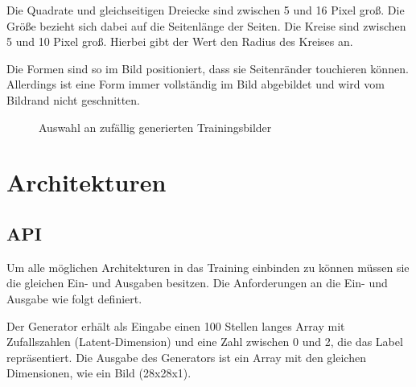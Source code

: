 Die Quadrate und gleichseitigen Dreiecke sind zwischen 5 und 16 Pixel groß.
Die Größe bezieht sich dabei auf die Seitenlänge der Seiten.
Die Kreise sind zwischen 5 und 10 Pixel groß.
Hierbei gibt der Wert den Radius des Kreises an.
\newline

Die Formen sind so im Bild positioniert, dass sie Seitenränder touchieren können.
Allerdings ist eine Form immer vollständig im Bild abgebildet und wird vom Bildrand nicht geschnitten.

\newcommand{\trainDataImage}[1]{\subfloat{\fbox{\texttt{[image: \#1]}}}}
\begin{figure}[H]
	\centering
	\trainDataImage{kapitel/3\_methodik/data/circle\_00.png}
	\trainDataImage{kapitel/3\_methodik/data/circle\_01.png}
	\trainDataImage{kapitel/3\_methodik/data/circle\_02.png}\par 
	
	\trainDataImage{kapitel/3\_methodik/data/rectangle\_00.png}
	\trainDataImage{kapitel/3\_methodik/data/rectangle\_01.png}
	\trainDataImage{kapitel/3\_methodik/data/rectangle\_02.png}\par 
	
	\trainDataImage{kapitel/3\_methodik/data/triangle\_00.png}
	\trainDataImage{kapitel/3\_methodik/data/triangle\_01.png}
	\trainDataImage{kapitel/3\_methodik/data/triangle\_02.png}\par 
	
	\caption{Auswahl an zufällig generierten Trainingsbilder}
\end{figure}

\section{Architekturen}
\subsection{API}
Um alle möglichen Architekturen in das Training einbinden zu können müssen sie die gleichen Ein- und Ausgaben besitzen.
Die Anforderungen an die Ein- und Ausgabe wie folgt definiert.
\newline

Der Generator erhält als Eingabe einen 100 Stellen langes Array mit Zufallszahlen (Latent-Dimension) und eine Zahl zwischen 0 und 2, die das Label repräsentiert.
Die Ausgabe des Generators ist ein Array mit den gleichen Dimensionen, wie ein Bild (28x28x1).
\newline


